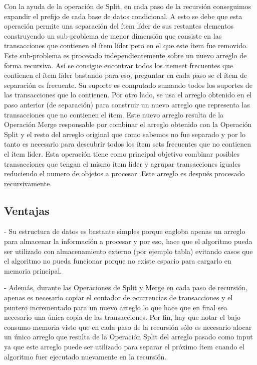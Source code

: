 \documentclass[12pt,spanish]{article}
\begin{document}
Con la ayuda de la operación de Split, en cada paso de la recursión conseguimos expandir el prefijo de cada base de datos condicional. A esto se debe que esta operación permite una separación del ítem líder de sus restantes elementos construyendo un sub-problema de menor dimensión que consiste en las transacciones que contienen el ítem líder pero en el que este ítem fue removido. Este sub-problema es procesado independientemente sobre un nuevo arreglo de forma recursiva. Así se consigue encontrar todos los itemset frecuentes que contienen el ítem líder bastando para eso, preguntar en cada paso se el ítem de separación es frecuente. Su suporte es computado sumando todos los suportes de las transacciones que lo contienen. 
Por otro lado, se usa el arreglo obtenido en el paso anterior (de separación)  para construir un nuevo arreglo que representa las transacciones que no contienen el ítem. Este nuevo arreglo  resulta de la Operación Merge responsable por combinar el arreglo obtenido con la Operación Split y el resto del arreglo original que como sabemos no fue separado y por lo tanto es necesario para descubrir todos los ítem sets frecuentes que no contienen el ítem líder. Esta operación tiene como principal objetivo combinar posibles transacciones que tengan el mismo ítem líder y agrupar transacciones iguales reduciendo el numero de objetos a procesar. Este arreglo es después procesado recursivamente.

\subsection{Ventajas}

- Su estructura de datos es bastante simples porque engloba apenas un arreglo para almacenar la información a procesar y por eso, hace que el algoritmo pueda ser utilizado con almacenamiento  externo (por ejemplo tabla) evitando casos que el algoritmo no pueda funcionar porque no existe espacio para cargarlo en memoria principal.

- Además, durante las Operaciones de Split y Merge en cada paso de recursión, apenas es necesario copiar el contador de ocurrencias de transacciones y el puntero incrementado para un nuevo arreglo lo que hace que en final sea necesario una única copia de las transacciones. Por fin, hay que notar el bajo consumo memoria visto que en cada paso de la recursión sólo es necesario alocar un único arreglo que resulta de la Operación Split  del  arreglo pasado como input ya que este arreglo puede ser utilizado para separar el próximo ítem cuando el algoritmo fuer ejecutado nuevamente en la recursión.
\end{document}
